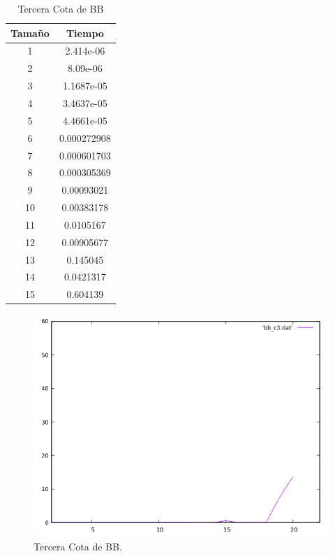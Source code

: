 \documentclass[a4paper,12pt,twoside]{article} %
\begin{document}
\begin{table}[h]
    \begin{center}
	\begin{tabular}{|c|c|}
		\hline
		Tamaño & Tiempo \\
		\hline
            1 & 2.414e-06 \\
            2 & 8.09e-06 \\
            3 & 1.1687e-05 \\
            4 & 3.4637e-05 \\
            5 & 4.4661e-05 \\
            6 & 0.000272908 \\
            7 & 0.000601703 \\
            8 & 0.000305369 \\
            9 & 0.00093021 \\
            10 & 0.00383178 \\
            11 & 0.0105167 \\
            12 & 0.00905677 \\
            13 & 0.145045 \\
            14 & 0.0421317 \\
            15 & 0.604139 \\
		\hline
	\end{tabular}
    \end{center}
    \caption{Tercera Cota de BB}
\end{table}
\newpage
\begin{figure}[h]
  \begin{center}
  
  	\includegraphics[scale=0.7]{IMAGENES/bb_c3.png}
  	\caption{Tercera Cota de BB.}
  	
  \end{center}
\end{figure}
\newpage
\end{document}
